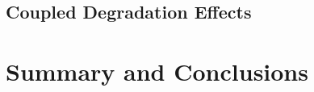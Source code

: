 \documentclass[11pt,a4paper]{article}
\begin{document}
\subsection{Coupled Degradation Effects}
\label{subsec:coupled_effects}


\section{Summary and Conclusions}
\label{sec:conclusions}


\newpage
 

\end{document}
